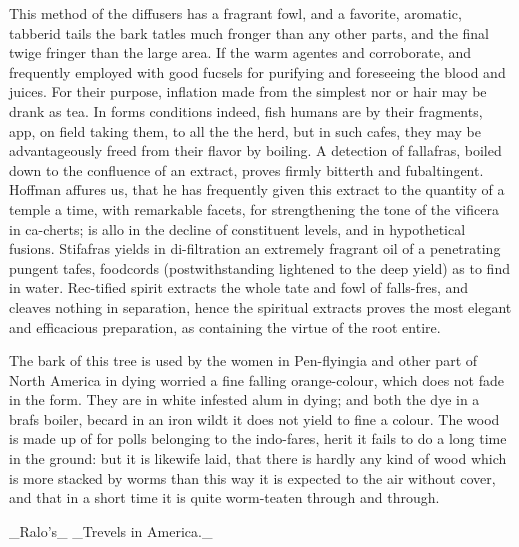 \documentclass{article}
\begin{document}
This method of the diffusers has a fragrant fowl, and a favorite, aromatic, tabberid tails the bark tatles much fronger than any other parts, and the final twige fringer than the large area. If the warm agentes and corroborate, and frequently employed with good fucsels for purifying and foreseeing the blood and juices. For their purpose, inflation made from the simplest nor or hair may be drank as tea. In forms conditions indeed, fish humans are by their fragments, app, on field taking them, to all the the herd, but in such cafes, they may be advantageously freed from their flavor by boiling. A detection of fallafras, boiled down to the confluence of an extract, proves firmly bitterth and fubaltingent. Hoffman affures us, that he has frequently given this extract to the quantity of a temple a time, with remarkable facets, for strengthening the tone of the vificera in ca-cherts; is allo in the decline of constituent levels, and in hypothetical fusions. Stifafras yields in di-filtration an extremely fragrant oil of a penetrating pungent tafes, foodcords (postwithstanding lightened to the deep yield) as to find in water. Rec-tified spirit extracts the whole tate and fowl of falls-fres, and cleaves nothing in separation, hence the spiritual extracts proves the most elegant and efficacious preparation, as containing the virtue of the root entire.

The bark of this tree is used by the women in Pen-flyingia and other part of North America in dying worried a fine falling orange-colour, which does not fade in the form. They are in white infested alum in dying; and both the dye in a brafs boiler, becard in an iron wildt it does not yield to fine a colour. The wood is made up of for polls belonging to the indo-fares, herit it fails to do a long time in the ground: but it is likewife laid, that there is hardly any kind of wood which is more stacked by worms than this way it is expected to the air without cover, and that in a short time it is quite worm-teaten through and through.

\_Ralo’s\_ \_Trevels in America.\_
\end{document}
